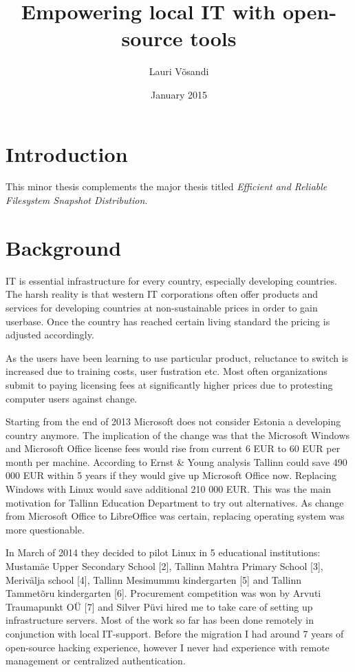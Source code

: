 \documentclass{article}
\title{Empowering local IT with open-source tools}
\author{Lauri Võsandi}
\date{January 2015}
\begin{document}
\maketitle

\section{Introduction}

This minor thesis complements the major thesis
titled \emph{Efficient and Reliable Filesystem Snapshot Distribution}.


\section{Background}

IT is essential infrastructure for every country, especially developing countries.
The harsh reality is that western IT corporations often offer products
and services for developing countries at non-sustainable prices in order
to gain userbase. Once the country has reached certain living standard the
pricing is adjusted accordingly.

As the users have been learning to use particular product,
reluctance to switch is increased due to training costs,
user fustration etc.
Most often organizations submit to paying licensing fees at significantly
higher prices due to protesting computer users against change.

Starting from the end of 2013 Microsoft does not consider Estonia a developing country
anymore. The implication of the change was that the Microsoft Windows and Microsoft
Office license fees would rise from current 6 EUR to 60 EUR per month per machine.
According to Ernst \& Young analysis Tallinn could save 490 000 EUR within 5 years
if they would give up Microsoft Office now. Replacing Windows with Linux would
save additional 210 000 EUR. This was the main motivation for Tallinn Education Department to try out alternatives. As change from Microsoft Office to LibreOffice was certain, replacing operating system was more questionable.

In March of 2014 they decided to pilot Linux in 5 educational institutions: Mustamäe Upper Secondary School [2], Tallinn Mahtra Primary School [3], Merivälja school [4], Tallinn Mesimummu kindergarten [5] and Tallinn Tammetõru kindergarten [6]. Procurement competition was won by Arvuti Traumapunkt OÜ [7] and Silver Püvi hired me to take care of setting up infrastructure servers. Most of the work so far has been done remotely in conjunction with local IT-support. Before the migration I had around 7 years of open-source hacking experience, however I never had experience with remote management or centralized authentication.
\end{document}
